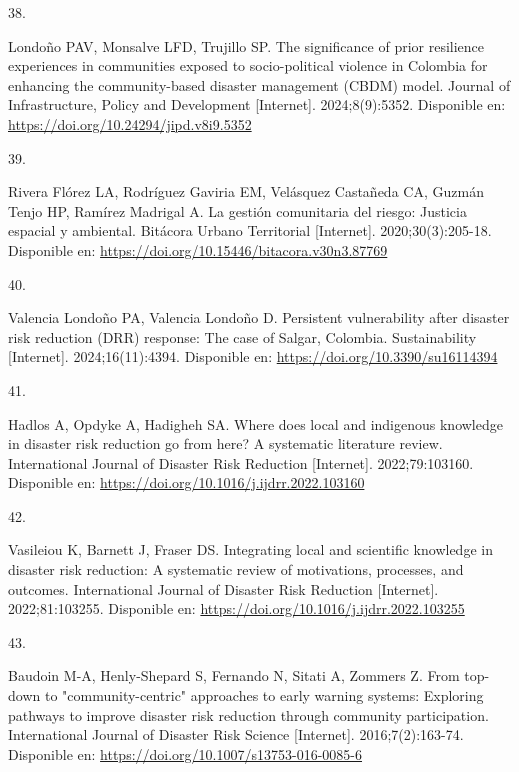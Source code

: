 \documentclass[
  spanish,
  letterpaper,
]{book}
\newlength{\cslhangindent}
\newlength{\csllabelwidth}
\newenvironment{CSLReferences}[2] %
 {\begin{list}{}{%
  \setlength{\itemindent}{0pt}
  \setlength{\leftmargin}{0pt}
  \setlength{\parsep}{0pt}
  \ifodd #1
   \setlength{\leftmargin}{\cslhangindent}
   \setlength{\itemindent}{-1\cslhangindent}
  \fi
  \setlength{\itemsep}{#2\baselineskip}}}
 {\end{list}}
\newcommand{\CSLLeftMargin}[1]{\parbox[t]{\csllabelwidth}{\strut#1\strut}}
\newcommand{\CSLRightInline}[1]{\parbox[t]{\linewidth - \csllabelwidth}{\strut#1\strut}}
\begin{document}
\begin{CSLReferences}{0}{1}
\CSLLeftMargin{38. }%
\CSLRightInline{Londoño PAV, Monsalve LFD, Trujillo SP. The significance
of prior resilience experiences in communities exposed to
socio-political violence in Colombia for enhancing the community-based
disaster management (CBDM) model. Journal of Infrastructure, Policy and
Development {[}Internet{]}. 2024;8(9):5352. Disponible en:
\url{https://doi.org/10.24294/jipd.v8i9.5352}}

\CSLLeftMargin{39. }%
\CSLRightInline{Rivera Flórez LA, Rodríguez Gaviria EM, Velásquez
Castañeda CA, Guzmán Tenjo HP, Ramírez Madrigal A. La gestión
comunitaria del riesgo: Justicia espacial y ambiental. Bitácora Urbano
Territorial {[}Internet{]}. 2020;30(3):205-18. Disponible en:
\url{https://doi.org/10.15446/bitacora.v30n3.87769}}

\CSLLeftMargin{40. }%
\CSLRightInline{Valencia Londoño PA, Valencia Londoño D. Persistent
vulnerability after disaster risk reduction (DRR) response: The case of
Salgar, Colombia. Sustainability {[}Internet{]}. 2024;16(11):4394.
Disponible en: \url{https://doi.org/10.3390/su16114394}}

\CSLLeftMargin{41. }%
\CSLRightInline{Hadlos A, Opdyke A, Hadigheh SA. Where does local and
indigenous knowledge in disaster risk reduction go from here? A
systematic literature review. International Journal of Disaster Risk
Reduction {[}Internet{]}. 2022;79:103160. Disponible en:
\url{https://doi.org/10.1016/j.ijdrr.2022.103160}}

\CSLLeftMargin{42. }%
\CSLRightInline{Vasileiou K, Barnett J, Fraser DS. Integrating local and
scientific knowledge in disaster risk reduction: A systematic review of
motivations, processes, and outcomes. International Journal of Disaster
Risk Reduction {[}Internet{]}. 2022;81:103255. Disponible en:
\url{https://doi.org/10.1016/j.ijdrr.2022.103255}}

\CSLLeftMargin{43. }%
\CSLRightInline{Baudoin M-A, Henly-Shepard S, Fernando N, Sitati A,
Zommers Z. From top-down to "community-centric" approaches to early
warning systems: Exploring pathways to improve disaster risk reduction
through community participation. International Journal of Disaster Risk
Science {[}Internet{]}. 2016;7(2):163-74. Disponible en:
\url{https://doi.org/10.1007/s13753-016-0085-6}}

\end{CSLReferences}
\end{document}
